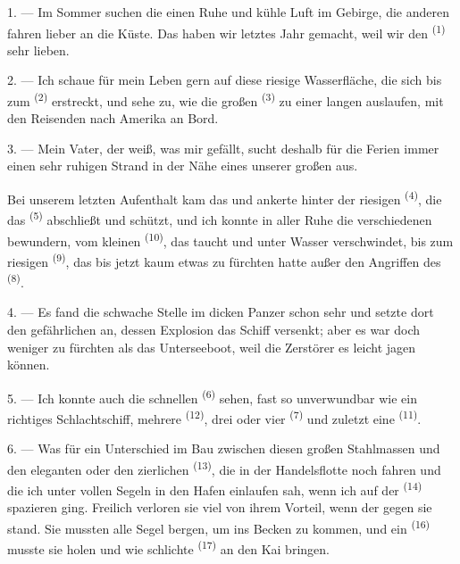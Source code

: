 \VUsaut{4.0mm}
\VUsaut{3.0mm}
\VUsaut{3.0mm}

1. --- Im Sommer suchen die einen Ruhe und kühle Luft im Gebirge, die anderen fahren
lieber an die Küste. Das haben wir letztes Jahr gemacht, weil wir den 
\textsuperscript{(1)} sehr lieben.

2. --- Ich schaue für mein Leben gern auf diese riesige Wasserfläche, die sich bis
zum  \textsuperscript{(2)} erstreckt, und sehe zu, wie die großen
 \textsuperscript{(3)} zu einer langen  auslaufen,
mit den Reisenden nach Amerika an Bord.

3. --- Mein Vater, der weiß, was mir gefällt, sucht deshalb für die Ferien immer
einen sehr ruhigen Strand in der Nähe eines unserer großen  aus.

Bei unserem letzten Aufenthalt kam das  und ankerte hinter der
riesigen  \textsuperscript{(4)}, die das 
\textsuperscript{(5)} abschließt und schützt, und ich konnte in aller Ruhe die
verschiedenen  bewundern, vom kleinen 
\textsuperscript{(10)}, das taucht und unter Wasser verschwindet, bis zum riesigen
 \textsuperscript{(9)}, das bis jetzt kaum etwas zu fürchten
hatte außer den Angriffen des  \textsuperscript{(8)}.

\VUsaut{3.0mm}
\VUsaut{3.0mm}

4. --- Es fand die schwache Stelle im dicken Panzer schon sehr  und
setzte dort den gefährlichen  an, dessen Explosion das Schiff
versenkt; aber es war doch weniger zu fürchten als das Unterseeboot, weil die
Zerstörer es leicht jagen können.

5. --- Ich konnte auch die schnellen  \textsuperscript{(6)}
sehen, fast so unverwundbar wie ein richtiges Schlachtschiff, mehrere
 \textsuperscript{(12)}, drei oder vier
 \textsuperscript{(7)} und zuletzt eine 
\textsuperscript{(11)}. 

6. --- Was für ein Unterschied im Bau zwischen diesen großen Stahlmassen und den
eleganten  oder den zierlichen 
\textsuperscript{(13)}, die in der Handelsflotte noch fahren und die ich unter vollen
Segeln in den Hafen einlaufen sah, wenn ich auf der 
\textsuperscript{(14)} spazieren ging. Freilich verloren sie viel von ihrem Vorteil,
wenn der  gegen sie stand. Sie mussten alle Segel bergen, um ins Becken
zu kommen, und ein  \textsuperscript{(16)} musste sie holen
und wie schlichte  \textsuperscript{(17)} an den Kai bringen.

